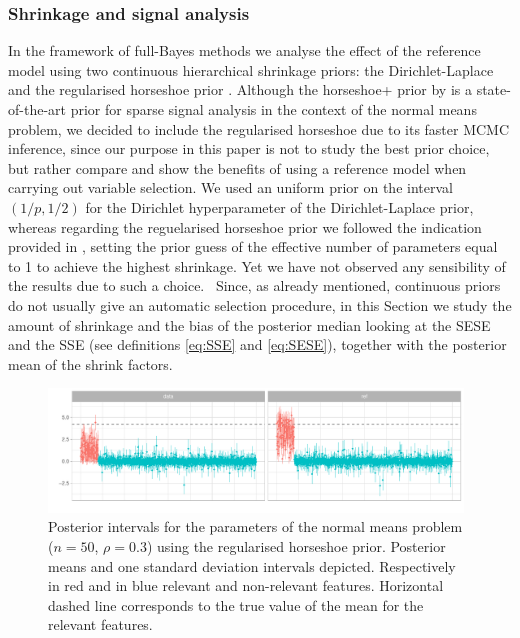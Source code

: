 \documentclass[american,]{article}
\theoremstyle{definition}
\begin{document}
\hypertarget{shrinkage-signal}{%
\subsubsection{Shrinkage and signal analysis}\label{shrinkage-signal}}
In the framework of full-Bayes methods we analyse the effect of the reference model using two continuous hierarchical shrinkage priors: the Dirichlet-Laplace \citep{paper:dirichlet_laplace} and the regularised horseshoe prior \citep{paper:rhs}. Although the horseshoe+ prior by \cite{bhadra2017horseshoe+} is a state-of-the-art prior for sparse signal analysis in the context of the normal means problem, we decided to include the regularised horseshoe due to its faster MCMC inference, since our purpose in this paper is not to study the best prior choice, but rather compare and show the benefits of using a reference model when carrying out variable selection. We used an uniform prior on the interval $(1/p,1/2)$ for the Dirichlet hyperparameter of the Dirichlet-Laplace prior, whereas regarding the reguelarised horseshoe prior we followed the indication provided in \cite{paper:rhs}, setting the prior guess of the effective number of parameters equal to 1 to achieve the highest shrinkage. Yet we have not observed any sensibility of the results due to such a choice.
\
Since, as already mentioned, continuous priors do not usually give an automatic selection procedure, in this Section we study the amount of shrinkage and the bias of the posterior median looking at the SESE and the SSE (see definitions \eqref{eq:SSE} and \eqref{eq:SESE}), together with the posterior mean of the shrink factors. 

\begin{figure}[tp]
  \centering
  \includegraphics[width=0.98\textwidth]{graphics/post_int.pdf}
  \caption{Posterior intervals for the parameters of the normal means problem ($n=50$, $\rho=0.3$) using the regularised horseshoe prior. Posterior means and one standard deviation intervals depicted. Respectively in red and in blue relevant and non-relevant features. Horizontal dashed line corresponds to the true value of the mean for the relevant features.\\}
  \label{fig:posterior_intervals}
\end{figure}
\end{document}
